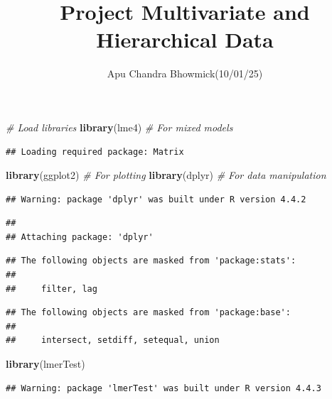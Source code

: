 \documentclass[
]{article}
\title{Project Multivariate and Hierarchical Data}
\subtitle{Apu Chandra Bhowmick(10/01/25)}
\author{}
\date{\vspace{-2.5em}}
\newenvironment{Shaded}{\begin{snugshade}}{\end{snugshade}}
\newcommand{\CommentTok}[1]{\textcolor[rgb]{0.56,0.35,0.01}{\textit{#1}}}
\newcommand{\FunctionTok}[1]{\textcolor[rgb]{0.13,0.29,0.53}{\textbf{#1}}}
\newcommand{\NormalTok}[1]{#1}
\begin{document}
\maketitle

\begin{Shaded}
\begin{Highlighting}[]
\CommentTok{\# Load libraries}
\FunctionTok{library}\NormalTok{(lme4)      }\CommentTok{\# For mixed models}
\end{Highlighting}
\end{Shaded}

\begin{verbatim}
## Loading required package: Matrix
\end{verbatim}

\begin{Shaded}
\begin{Highlighting}[]
\FunctionTok{library}\NormalTok{(ggplot2)   }\CommentTok{\# For plotting}
\FunctionTok{library}\NormalTok{(dplyr)     }\CommentTok{\# For data manipulation}
\end{Highlighting}
\end{Shaded}

\begin{verbatim}
## Warning: package 'dplyr' was built under R version 4.4.2
\end{verbatim}

\begin{verbatim}
## 
## Attaching package: 'dplyr'
\end{verbatim}

\begin{verbatim}
## The following objects are masked from 'package:stats':
## 
##     filter, lag
\end{verbatim}

\begin{verbatim}
## The following objects are masked from 'package:base':
## 
##     intersect, setdiff, setequal, union
\end{verbatim}

\begin{Shaded}
\begin{Highlighting}[]
\FunctionTok{library}\NormalTok{(lmerTest) }
\end{Highlighting}
\end{Shaded}

\begin{verbatim}
## Warning: package 'lmerTest' was built under R version 4.4.3
\end{verbatim}
\end{document}

